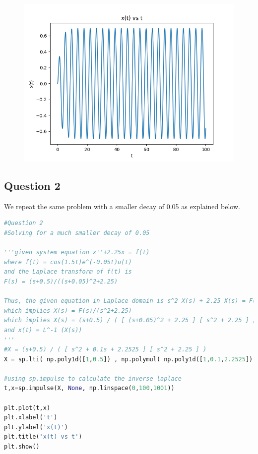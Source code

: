 \documentclass[11pt, a4paper]{article}
\begin{document}
\begin{figure}[H]
     \centering
     \includegraphics[scale=0.8]{Figure_1.png}
\end{figure}



\subsection{Question 2}

We repeat the same problem with a smaller decay of 0.05 as explained below.

\begin{lstlisting}[language = Python]
#Question 2
#Solving for a much smaller decay of 0.05

'''given system equation x''+2.25x = f(t)
where f(t) = cos(1.5t)e^(-0.05t)u(t)
and the Laplace transform of f(t) is
F(s) = (s+0.5)/((s+0.05)^2+2.25)

Thus, the given equation in Laplace domain is s^2 X(s) + 2.25 X(s) = F(s)
which implies X(s) = F(s)/(s^2+2.25)
which implies X(s) = (s+0.5) / ( [ (s+0.05)^2 + 2.25 ] [ s^2 + 2.25 ] )
and x(t) = L^-1 (X(s))
'''
#X = (s+0.5) / ( [ s^2 + 0.1s + 2.2525 ] [ s^2 + 2.25 ] )
X = sp.lti( np.poly1d([1,0.5]) , np.polymul( np.poly1d([1,0.1,2.2525]) , np.poly1d([1,0,2.25]) ) )

#using sp.impulse to calculate the inverse laplace
t,x=sp.impulse(X, None, np.linspace(0,100,1001))

plt.plot(t,x)
plt.xlabel('t')
plt.ylabel('x(t)')
plt.title('x(t) vs t')
plt.show()
\end{lstlisting}
\end{document}
